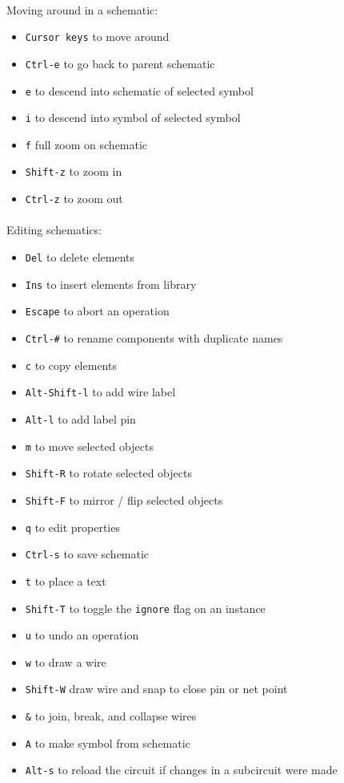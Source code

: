 \documentclass[
  a4paper,
  DIV=11,
  numbers=noendperiod]{scrartcl}
\makeatletter
\let\oldparagraph\paragraph
\renewcommand{\paragraph}{
    \@ifstar
      \xxxParagraphStar
      \xxxParagraphNoStar
  }
\newcommand{\xxxParagraphStar}[1]{\oldparagraph*{#1}\mbox{}}
\newcommand{\xxxParagraphNoStar}[1]{\oldparagraph{#1}\mbox{}}
\providecommand{\tightlist}{%
  \setlength{\itemsep}{0pt}\setlength{\parskip}{0pt}}\usepackage{longtable,booktabs,array}
\makeatother
\begin{document}
\paragraph{Moving around in a
schematic:}\label{moving-around-in-a-schematic}

\begin{itemize}
\tightlist
\item
  \texttt{Cursor\ keys} to move around
\item
  \texttt{Ctrl-e} to go back to parent schematic
\item
  \texttt{e} to descend into schematic of selected symbol
\item
  \texttt{i} to descend into symbol of selected symbol
\item
  \texttt{f} full zoom on schematic
\item
  \texttt{Shift-z} to zoom in
\item
  \texttt{Ctrl-z} to zoom out
\end{itemize}

\paragraph{Editing schematics:}\label{editing-schematics}

\begin{itemize}
\tightlist
\item
  \texttt{Del} to delete elements
\item
  \texttt{Ins} to insert elements from library
\item
  \texttt{Escape} to abort an operation
\item
  \texttt{Ctrl-\#} to rename components with duplicate names
\item
  \texttt{c} to copy elements
\item
  \texttt{Alt-Shift-l} to add wire label
\item
  \texttt{Alt-l} to add label pin
\item
  \texttt{m} to move selected objects
\item
  \texttt{Shift-R} to rotate selected objects
\item
  \texttt{Shift-F} to mirror / flip selected objects
\item
  \texttt{q} to edit properties
\item
  \texttt{Ctrl-s} to save schematic
\item
  \texttt{t} to place a text
\item
  \texttt{Shift-T} to toggle the \texttt{ignore} flag on an instance
\item
  \texttt{u} to undo an operation
\item
  \texttt{w} to draw a wire
\item
  \texttt{Shift-W} draw wire and snap to close pin or net point
\item
  \texttt{\&} to join, break, and collapse wires
\item
  \texttt{A} to make symbol from schematic
\item
  \texttt{Alt-s} to reload the circuit if changes in a subcircuit were
  made
\end{itemize}
\end{document}
